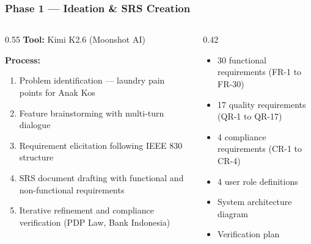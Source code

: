 \documentclass[aspectratio=169,professionalfonts,10pt]{beamer}
\begin{document}
\begin{frame}
    \frametitle{Phase 1 --- Ideation \& SRS Creation}
    \small
    \begin{columns}[T]
        \begin{column}{0.55\textwidth}
            \textbf{Tool:} Kimi K2.6 (Moonshot AI)

            \vspace{0.3em}
            \textbf{Process:}
            \begin{enumerate}\setlength{\itemsep}{1pt}
                \item Problem identification --- laundry pain points for Anak Kos
                \item Feature brainstorming with multi-turn dialogue
                \item Requirement elicitation following IEEE 830 structure
                \item SRS document drafting with functional and non-functional requirements
                \item Iterative refinement and compliance verification (PDP Law, Bank Indonesia)
            \end{enumerate}
        \end{column}

        \begin{column}{0.42\textwidth}
            \begin{tcolorbox}[colback=ugmLightGrey,colframe=ugmBlue,title=\small SRS Outputs]
                \scriptsize
                \begin{itemize}\setlength{\itemsep}{1pt}
                    \item 30 functional requirements (FR-1 to FR-30)
                    \item 17 quality requirements (QR-1 to QR-17)
                    \item 4 compliance requirements (CR-1 to CR-4)
                    \item 4 user role definitions
                    \item System architecture diagram
                    \item Verification plan
                \end{itemize}
            \end{tcolorbox}
        \end{column}
    \end{columns}
\end{frame}
\end{document}
